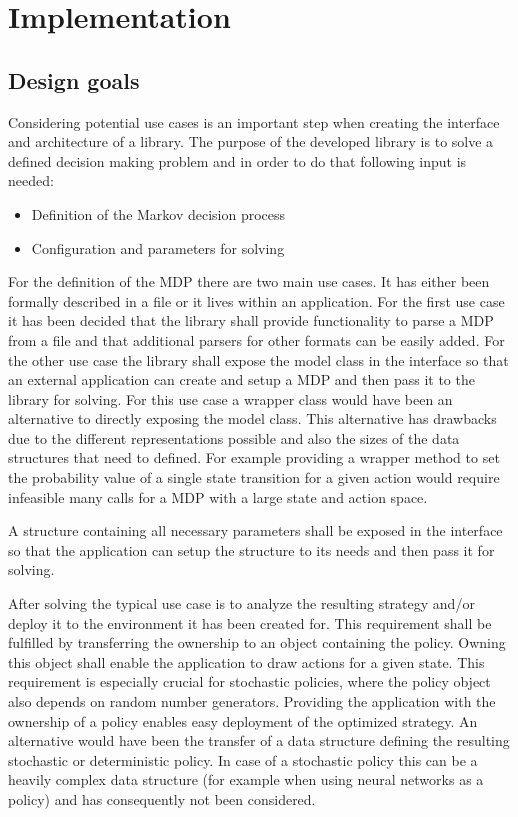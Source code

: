 \chapter{Implementation}

\section{Design goals}
\label{goals}

Considering potential use cases is an important step when creating the interface and architecture of a library. The purpose of the developed library is to solve a defined decision making problem and in order to do that following input is needed:

\begin{itemize}
	\item Definition of the Markov decision process
	\item Configuration and parameters for solving
\end{itemize}

For the definition of the MDP there are two main use cases. It has either been formally described in a file or it lives within an application. For the first use case it has been decided that the library shall provide functionality to parse a MDP from a file and that additional parsers for other formats can be easily added. For the other use case the library shall expose the model class in the interface so that an external application can create and setup a MDP and then pass it to the library for solving. For this use case a wrapper class would have been an alternative to directly exposing the model class. This alternative has drawbacks due to the different representations possible and also the sizes of the data structures that need to defined. For example providing a wrapper method to set the probability value of a single state transition for a given action would require infeasible many calls for a MDP with a large state and action space. 

A structure containing all necessary parameters shall be exposed in the interface so that the application can setup the structure to its needs and then pass it for solving. 

After solving the typical use case is to analyze the resulting strategy and/or deploy it to the environment it has been created for. This requirement shall be fulfilled by transferring the ownership to an object containing the policy. Owning this object shall enable the application to draw actions for a given state. This requirement is especially crucial for stochastic policies, where the policy object also depends on random number generators. Providing the application with the ownership of a policy enables easy deployment of the optimized strategy. An alternative would have been the transfer of a data structure defining the resulting stochastic or deterministic policy. In case of a stochastic policy this can be a heavily complex data structure (for example when using neural networks as a policy) and has consequently not been considered. 

